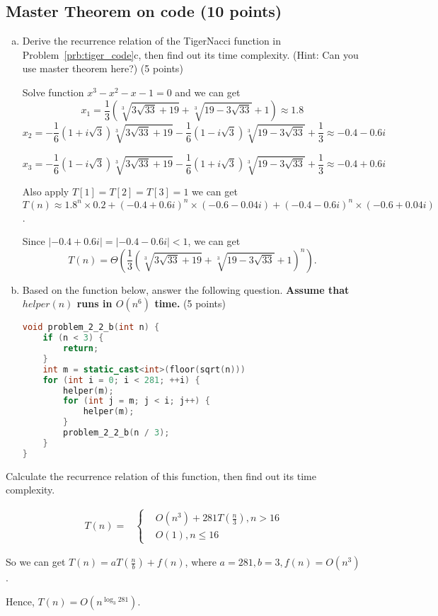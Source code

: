 \documentclass[11pt]{exam}
\begin{document}
\subsection{Master Theorem on code (10 points)}
\begin{enumerate}[(a)]

    \item
          Derive the recurrence relation of the TigerNacci function in Problem~\ref{prb:tiger_code}c, then find out its time complexity.
          (Hint: Can you use master theorem here?) (5 points)
          \begin{solution}
              Solve function $x^3-x^2-x-1=0$ and we can get
              \[x_1 =\frac{1}{3} \left(\sqrt[3]{3 \sqrt{33}+19}+\sqrt[3]{19-3 \sqrt{33}}+1\right) \approx 1.8\]
              \[x_2 = -\frac{1}{6} \left(1+i \sqrt{3}\right) \sqrt[3]{3 \sqrt{33}+19}-\frac{1}{6} \left(1-i \sqrt{3}\right) \sqrt[3]{19-3 \sqrt{33}}+\frac{1}{3} \approx -0.4 -0.6i\]

              \[x_3 = -\frac{1}{6} \left(1-i \sqrt{3}\right) \sqrt[3]{3 \sqrt{33}+19}-\frac{1}{6} \left(1+i \sqrt{3}\right) \sqrt[3]{19-3 \sqrt{33}}+\frac{1}{3} \approx -0.4+0.6i\]

              Also apply $T[1]=T[2]=T[3]=1$ we can get $T(n) \approx 1.8 ^n \times 0.2 + (-0.4+0.6i)^n \times (-0.6-0.04i) + (-0.4-0.6i)^n \times (-0.6+0.04i) $.

              Since $|-0.4+0.6i|=|-0.4-0.6i|<1$,
              we can get \[ T(n) = \Theta\left(\frac{1}{3} \left(\sqrt[3]{3 \sqrt{33}+19}+\sqrt[3]{19-3 \sqrt{33}}+1\right)^n\right). \]
          \end{solution}
    \item
          Based on the function below, answer the following question. \textbf{Assume that $helper(n)$ runs in $O(n^6)$ time.} (5 points)
          \begin{lstlisting}[language=c++]
void problem_2_2_b(int n) {
	if (n < 3) {
		return;
	}
	int m = static_cast<int>(floor(sqrt(n)))
	for (int i = 0; i < 281; ++i) {
		helper(m);
		for (int j = m; j < i; j++) {
			helper(m);
		}
		problem_2_2_b(n / 3);
	}
}
\end{lstlisting}
\end{enumerate}
Calculate the recurrence relation of this function, then find out its time complexity.
\begin{solution}
    \begin{align*}
        T(n)=
         & \begin{cases}
                & O(n^3) + 281 T(\frac{n}{3}), n > 16 \\
                & O(1) ,n \leq 16
           \end{cases}
    \end{align*}

    So we can get $T(n) = aT(\frac{n}{b}) + f(n)$, where $a=281,b=3, f(n)= O(n^3)$.

    Hence, $T(n)= O(n^{\log_3 281})$.

\end{solution}
\end{document}
